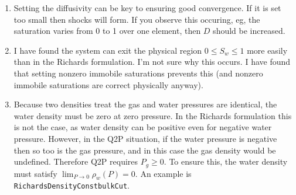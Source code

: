 \documentclass[]{scrreprt}
\begin{document}
\begin{enumerate}
\item Setting the diffusivity can be key to ensuring good convergence.
  If it is set too small then shocks will form.  If you observe this
  occuring, eg, the saturation   varies from 0 to 1 over one element,
  then $D$ should be increased.

\item I have found the system can exit the physical region $0\leq
  S_{w} \leq 1$ more easily than in the Richards formulation.  I'm not
  sure why this occurs.  I have found that setting nonzero immobile
  saturations prevents this (and nonzero immobile saturations are
  correct physically anyway).

\item Because two densities treat the gas and water pressures are
  identical, the water density must be zero at zero pressure.  In the
  Richards formulation this is not the case, as water density can be
  positive even for negative water pressure.  However, in the Q2P
  situation, if the water pressure is negative then so too is the gas
  pressure, and in this case the gas density would be undefined.
  Therefore Q2P requires $P_{g}\geq 0$.  To ensure this, the water
  density must satisfy $\lim_{P\rightarrow 0}\rho_{w}(P) = 0$.  An
  example is {\tt RichardsDensityConstbulkCut}.

\end{enumerate}
\end{document}
